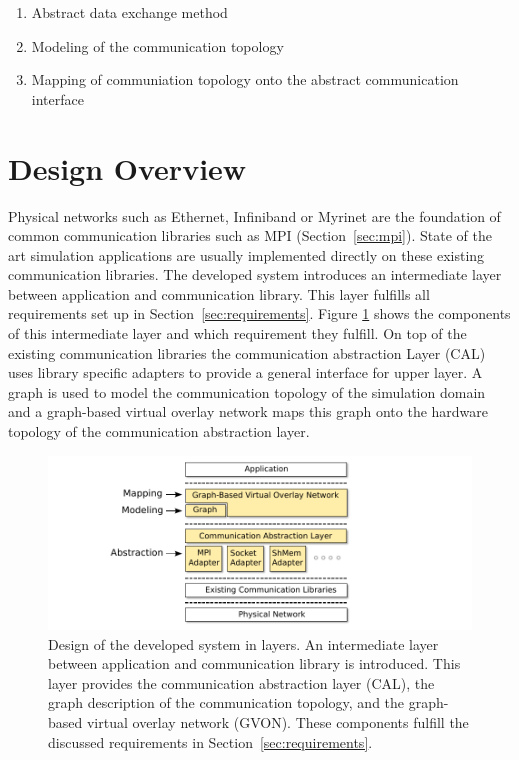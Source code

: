 \begin{enumerate}
\item Abstract data exchange method
\item Modeling of the communication topology
\item Mapping of communiation topology onto the abstract communication interface
\end{enumerate}



\section{Design Overview}

Physical networks such as Ethernet, Infiniband or Myrinet are the
foundation of common communication libraries such as MPI
(Section~\ref{sec:mpi}).  State of the art simulation applications are
usually implemented directly on these existing communication
libraries. The developed system introduces an intermediate layer
between application and communication library. This layer fulfills all
requirements set up in Section~\ref{sec:requirements}. Figure
\ref{fig:design} shows the components of this intermediate layer and
which requirement they fulfill.  On top of the existing communication
libraries the communication abstraction Layer (CAL) uses library
specific adapters to provide a general interface for upper layer.  A
graph is used to model the communication topology of the simulation
domain and a graph-based virtual overlay network maps this graph onto
the hardware topology of the communication abstraction layer.

\begin{figure}[H]
  \centering \includegraphics[width=\textwidth]{graphics/30_design}
  \caption{Design of the developed system in layers. An intermediate
    layer between application and communication library is introduced.
    This layer provides the communication abstraction layer (CAL), the
    graph description of the communication topology, and the
    graph-based virtual overlay network (GVON). These components
    fulfill the discussed requirements in
    Section~\ref{sec:requirements}.}
  \label{fig:design}
\end{figure}

